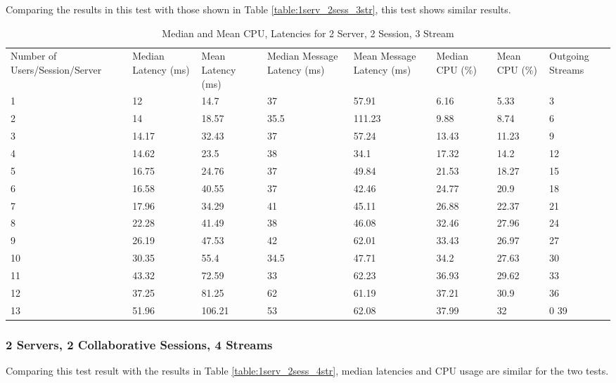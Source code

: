 Comparing the results in this test with those shown in Table \ref{table:1serv_2sess_3str}, this test shows similar results.

\begin{table}
\caption{Median and Mean CPU, Latencies for 2 Server, 2 Session, 3 Stream}
\label{table:2serv_2sess_3str}
\begin{tabu} to\linewidth{|X[c]|X[c]|X[c]|X[c]|X[c]|X[c]|X[c]|X[c]|}
\everyrow{\hline}
\hline
Number of Users/Session/Server & Median Latency (ms) & Mean Latency (ms) & Median Message Latency (ms) & Mean Message Latency (ms) & Median CPU (\%) & Mean CPU (\%) & Outgoing Streams\\
1 & 12 & 14.7 & 37 & 57.91 & 6.16 & 5.33 & 3 \\
2 & 14 & 18.57 & 35.5 & 111.23 & 9.88 & 8.74 & 6 \\
3 & 14.17 & 32.43 & 37 & 57.24 & 13.43 & 11.23 & 9 \\
4 & 14.62 & 23.5 & 38 & 34.1 & 17.32 & 14.2 & 12 \\
5 & 16.75 & 24.76 & 37 & 49.84 & 21.53 & 18.27 & 15 \\
6 & 16.58 & 40.55 & 37 & 42.46 & 24.77 & 20.9 & 18 \\
7 & 17.96 & 34.29 & 41 & 45.11 & 26.88 & 22.37 & 21 \\
8 & 22.28 & 41.49 & 38 & 46.08 & 32.46 & 27.96 & 24 \\
9 & 26.19 & 47.53 & 42 & 62.01 & 33.43 & 26.97 & 27 \\
10 & 30.35 & 55.4 & 34.5 & 47.71 & 34.2 & 27.63 & 30 \\
11 & 43.32 & 72.59 & 33 & 62.23 & 36.93 & 29.62 & 33 \\
12 & 37.25 & 81.25 & 62 & 61.19 & 37.21 & 30.9 & 36 \\
13 & 51.96 & 106.21 & 53 & 62.08 & 37.99 & 32 & 0 39 \\
\end{tabu}
\end{table}

\clearpage\subsubsection{2 Servers, 2 Collaborative Sessions, 4 Streams}

Comparing this test result with the results in Table \ref{table:1serv_2sess_4str}, median latencies and CPU usage are similar for the two tests.

